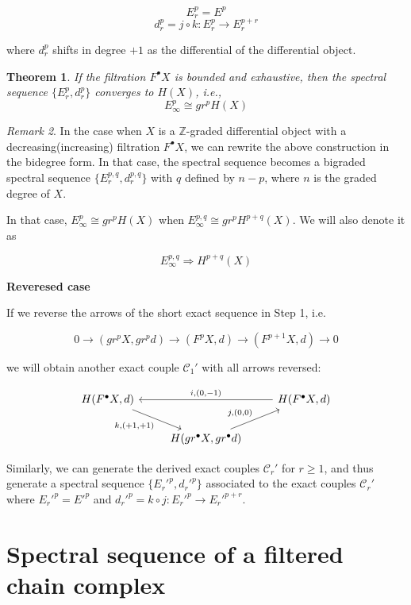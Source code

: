 \documentclass[12pt, reqno]{amsart}
\newtheorem{theorem}{Theorem}[section]
\theoremstyle{definition}
\theoremstyle{remark}
\newtheorem{remark}[theorem]{Remark}
\numberwithin{equation}{section}
\begin{document}
{\[E_r^{p} = E^{p}\]
\[d_r^{p} = j \circ k: E_r^{p} \to E_r^{p+r}\]

where $d_r^{p}$ shifts in degree $+1$ as the differential of the differential object.

\begin{theorem}
If the filtration $F^\bullet X$ is bounded and exhaustive, then the spectral sequence $\{E_r^{p}, d_r^{p}\}$ converges to $H(X)$, i.e.,
\[E_\infty^{p} \cong gr^p H(X)\]
\end{theorem}

\begin{remark}
    In the case when $X$ is a $\mathbb{Z}$-graded differential object with a decreasing(increasing) filtration $F^\bullet X$, we can rewrite the above construction in the bidegree form. In that case, the spectral sequence becomes a bigraded spectral sequence $\{E_r^{p, q}, d_r^{p, q}\}$ with $q$ defined by $n-p$, where $n$ is the graded degree of $X$.

    In that case, $E_\infty^{p} \cong gr^p H(X)$ when $E_\infty^{p, q} \cong gr^p H^{p+q}(X)$. We will also denote it as

    \[E_\infty^{p, q} \Rightarrow H^{p+q}(X)\]
\end{remark}

\textbf{Reveresed case}

If we reverse the arrows of the short exact sequence in Step 1, i.e.

\[0 \to (gr^p X, gr^p d) \to (F^p X, d) \to (F^{p+1}X, d) \to 0\]

we will obtain another exact couple $\mathcal{C}_1'$ with all arrows reversed:

\[
\begin{tikzcd}
H (F^\bullet X, d)\arrow[dr, "{k, (+1, +1)}"']  & & H (F^\bullet X, d) \arrow[ll, "{i, (0, -1)}"'] \\
& H (gr^\bullet X, gr^\bullet d) \arrow[ur, "{j, (0, 0)}"] &
\end{tikzcd}
\]

Similarly, we can generate the derived exact couples $\mathcal{C}_r'$ for $r \geq 1$, and thus generate a spectral sequence $\{E_r'^{p}, d_r'^{p}\}$ associated to the exact couples $\mathcal{C}_r'$ where $E_r'^{p} = E'^{p}$ and $d_r'^{p} = k \circ j: E_r'^{p} \to E_r'^{p+r}$.


\section{Spectral sequence of a filtered chain complex}

}
\end{document}
